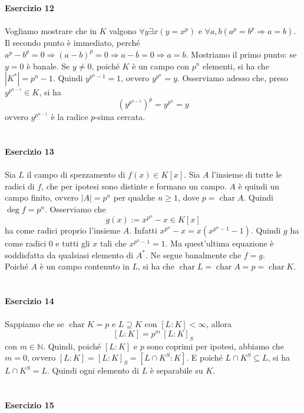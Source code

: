 \documentclass[12pt,a4paper]{report}
\theoremstyle{definition}
\newtheorem{lemma}[teo]{Lemma}  %
\DeclareMathOperator{\car}{char}
\begin{document}
\ 
\\
\\
\noindent\textbf{Esercizio 12}\\
\\
Vogliamo mostrare che in $K$ valgono $\forall y \exists x (y=x^p)$ e $\forall a,b (a^p=b^p \Rightarrow a=b)$. Il secondo punto è immediato, perché $a^p-b^p=0 \Rightarrow (a-b)^p=0 \Rightarrow a-b=0 \Rightarrow a=b$. Mostriamo il primo punto: se $y=0$ è banale. Se $y\neq 0$, poiché $K$ è un campo con $p^n$ elementi, si ha che $|K^*|=p^n-1$. Quindi $y^{p^n-1}=1$, ovvero $y^{p^n}=y$. Osserviamo adesso che, preso $y^{p^{n-1}} \in K$, si ha
$$\left(y^{p^{n-1}}\right)^p=y^{p^n}=y$$
ovvero $y^{p^{n-1}}$ è la radice $p$-sima cercata.
\\
\\
\\
\noindent\textbf{Esercizio 13}\\
\\
Sia $L$ il campo di spezzamento di $f(x) \in K[x]$. Sia $A$ l'insieme di tutte le radici di $f$, che per ipotesi sono distinte e formano un campo. $A$ è quindi un campo finito, ovvero $|A|=p^n$ per qualche $n \geq 1$, dove $p=\car A$. Quindi $\deg f=p^n$. Osserviamo che 
$$g(x):=x^{p^n}-x \in K[x]$$
ha come radici proprio l'insieme $A$. Infatti $x^{p^n}-x=x(x^{p^n-1}-1)$. Quindi $g$ ha come radici 0 e tutti gli $x$ tali che $x^{p^n-1}=1$. Ma quest'ultima equazione è soddisfatta da qualsiasi elemento di $A^*$. Ne segue banalmente che $f=g$.\\
Poiché $A$ è un campo contenuto in $L$, si ha che $\car L=\car A=p=\car K$.
\\
\\
\\
\noindent\textbf{Esercizio 14}\\
\\
Sappiamo che se $\car K=p$ e $L \supseteq K$ con $[L:K]<\infty$, allora 
$$[L:K]=p^m \, [L:K]_S$$
con $m \in \mathbb{N}$. Quindi, poiché $[L:K]$ e $p$ sono coprimi per ipotesi, abbiamo che $m=0$, ovvero $[L:K]=[L:K]_S=[L \cap K^S : K]$. E poiché $L \cap K^S \subseteq L$, si ha $L \cap K^S = L$. Quindi ogni elemento di $L$ è separabile su $K$.
\\
\\
\\
\noindent\textbf{Esercizio 15}
\\
\end{document}
